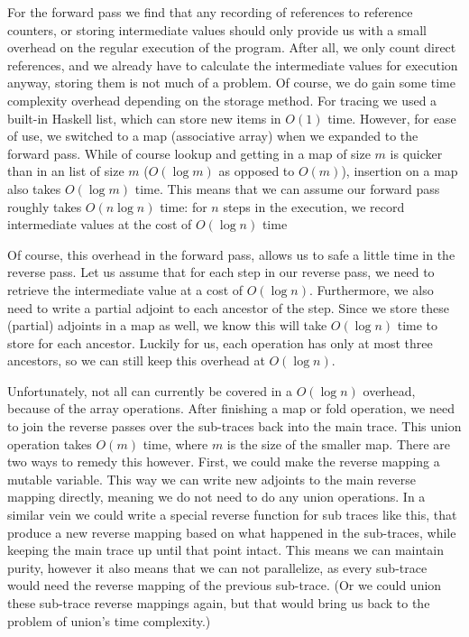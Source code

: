         For the forward pass we find that any recording of references to reference counters, or storing intermediate values should only provide us with a small overhead on the regular execution of the program.
        After all, we only count direct references, and we already have to calculate the intermediate values for execution anyway, storing them is not much of a problem.
        Of course, we do gain some time complexity overhead depending on the storage method.
        For tracing we used a built-in Haskell list, which can store new items in $O(1)$ time.
        However, for ease of use, we switched to a map (associative array) when we expanded to the forward pass.
        While of course lookup and getting in a map of size $m$ is quicker than in an list of size $m$ ($O(\log m)$ as opposed to $O(m)$), insertion on a map also takes $O(\log m)$ time.
        This means that we can assume our forward pass roughly takes $O(n\log n)$ time: for $n$ steps in the execution, we record intermediate values at the cost of $O(\log n)$ time

        Of course, this overhead in the forward pass, allows us to safe a little time in the reverse pass.
        Let us assume that for each step in our reverse pass, we need to retrieve the intermediate value at a cost of $O(\log n)$.
        Furthermore, we also need to write a partial adjoint to each ancestor of the step.
        Since we store these (partial) adjoints in a map as well, we know this will take $O(\log n)$ time to store for each ancestor.
        Luckily for us, each operation has only at most three ancestors, so we can still keep this overhead at $O(\log n)$.

        Unfortunately, not all can currently be covered in a $O(\log n)$ overhead, because of the array operations.
        After finishing a map or fold operation, we need to join the reverse passes over the sub-traces back into the main trace.
        This union operation takes $O(m)$ time, where $m$ is the size of the smaller map.
        There are two ways to remedy this however.
        First, we could make the reverse mapping a mutable variable.
        This way we can write new adjoints to the main reverse mapping directly, meaning we do not need to do any union operations.
        In a similar vein we could write a special reverse function for sub traces like this, that produce a new reverse mapping based on what happened in the sub-traces, while keeping the main trace up until that point intact.
        This means we can maintain purity, however it also means that we can not parallelize, as every sub-trace would need the reverse mapping of the previous sub-trace.
        (Or we could union these sub-trace reverse mappings again, but that would bring us back to the problem of union's time complexity.)

